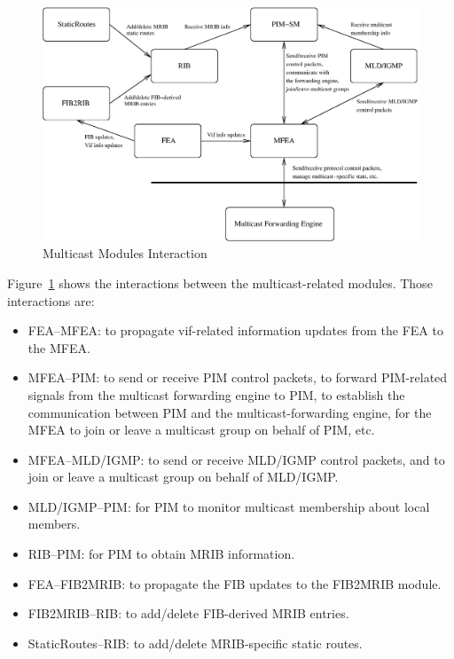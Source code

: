 \documentclass[11pt]{article}
\begin{document}
\begin{figure}[htbp]
  \begin{center}
    \includegraphics[scale=0.5]{figs/mcast_modules_interaction}
    \caption{Multicast Modules Interaction}
    \label{fig:mcast_modules_interaction}
  \end{center}
\end{figure}

Figure~\ref{fig:mcast_modules_interaction} shows the interactions between
the multicast-related modules. Those interactions are:

\begin{itemize}

  \item FEA--MFEA: to propagate vif-related information updates from the
   FEA to the MFEA.

  \item MFEA--PIM: to send or receive PIM control packets, to forward
   PIM-related signals from the multicast forwarding engine to PIM, to
   establish the communication between PIM and the multicast-forwarding
   engine, for the MFEA to join or leave a multicast group on behalf of
   PIM, etc.

  \item MFEA--MLD/IGMP: to send or receive MLD/IGMP control
  packets, and to join or leave a multicast group on behalf of
  MLD/IGMP.

  \item MLD/IGMP--PIM: for PIM to monitor multicast membership about
  local members.

  \item RIB--PIM: for PIM to obtain MRIB information.

  \item FEA--FIB2MRIB: to propagate the FIB updates to the FIB2MRIB module.

  \item FIB2MRIB--RIB: to add/delete FIB-derived MRIB entries.

  \item StaticRoutes--RIB: to add/delete MRIB-specific static routes.

\end{itemize}
\end{document}
